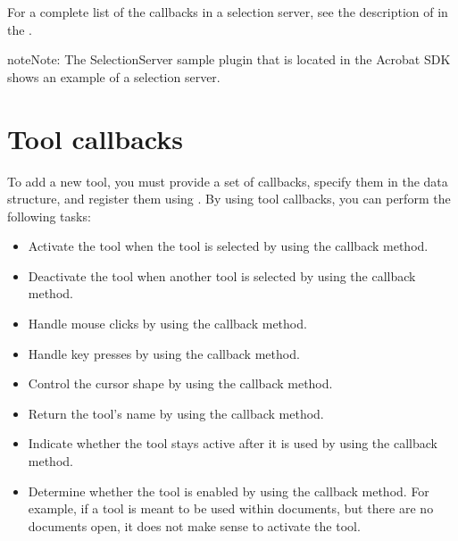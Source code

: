 \documentclass[letterpaper,12pt,english,openany,oneside]{sphinxmanual}
\begin{document}
For a complete list of the callbacks in a selection server, see the description of  in the .

\begin{sphinxadmonition}{note}{Note:}
The SelectionServer sample plugin that is located in the Acrobat SDK shows an example of a selection server.
\end{sphinxadmonition}


\section{Tool callbacks}
\label{\detokenize{Plugins_Handlers:tool-callbacks}}
To add a new tool, you must provide a set of callbacks, specify them in the  data structure, and register them using . By using tool callbacks, you can perform the following tasks:
\begin{itemize}
\item {} 
Activate the tool when the tool is selected by using the  callback method.

\item {} 
Deactivate the tool when another tool is selected by using the  callback method.

\item {} 
Handle mouse clicks by using the  callback method.

\item {} 
Handle key presses by using the  callback method.

\item {} 
Control the cursor shape by using the  callback method.

\item {} 
Return the tool’s name by using the  callback method.

\item {} 
Indicate whether the tool stays active after it is used by using the  callback method.

\item {} 
Determine whether the tool is enabled by using the  callback method. For example, if a tool is meant to be used within documents, but there are no documents open, it does not make sense to activate the tool.

\end{itemize}
\end{document}
